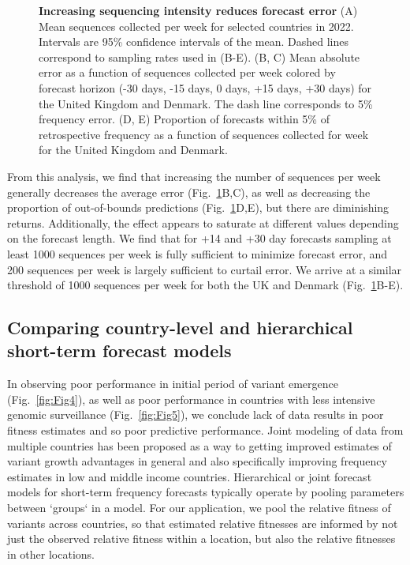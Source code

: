 \documentclass[10pt,letterpaper]{article}
\begin{document}
\begin{figure}[tb!]
    \centering
    \caption{
			\textbf{Increasing sequencing intensity reduces forecast error}
    	(A) Mean sequences collected per week for selected countries in 2022.
			Intervals are 95\% confidence intervals of the mean.
			Dashed lines correspond to sampling rates used in (B-E).
    	(B, C) Mean absolute error as a function of sequences collected per week colored by forecast horizon (-30 days, -15 days, 0 days, +15 days, +30 days) for the United Kingdom and Denmark.
			The dash line corresponds to 5\% frequency error.
    	(D, E) Proportion of forecasts within 5\% of retrospective frequency as a function of sequences collected for week for the United Kingdom and Denmark.
  	}
    \label{fig:Fig6}
\end{figure}


From this analysis, we find that increasing the number of sequences per week generally decreases the average error (Fig.~\ref{fig:Fig6}B,C), as well as decreasing the proportion of out-of-bounds predictions (Fig.~\ref{fig:Fig6}D,E), but there are diminishing returns.
Additionally, the effect appears to saturate at different values depending on the forecast length.
We find that for +14 and +30 day forecasts sampling at least 1000 sequences per week is fully sufficient to minimize forecast error, and 200 sequences per week is largely sufficient to curtail error.
We arrive at a similar threshold of 1000 sequences per week for both the UK and Denmark (Fig.~\ref{fig:Fig6}B-E).


\subsection*{Comparing country-level and hierarchical short-term forecast models}

In observing poor performance in initial period of variant emergence (Fig.\ \ref{fig:Fig4}), as well as poor performance in countries with less intensive genomic surveillance (Fig.\ \ref{fig:Fig5}), we conclude lack of data results in poor fitness estimates and so poor predictive performance.
Joint modeling of data from multiple countries has been proposed as a way to getting improved estimates of variant growth advantages in general and also specifically improving frequency estimates in low and middle income countries.
Hierarchical or joint forecast models for short-term frequency forecasts typically operate by pooling parameters between `groups` in a model.
For our application, we pool the relative fitness of variants across countries, so that estimated relative fitnesses are informed by not just the observed relative fitness within a location, but also the relative fitnesses in other locations.
\end{document}
